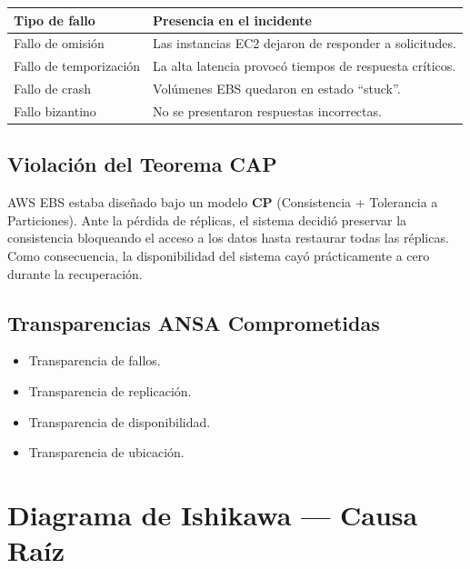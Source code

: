 \documentclass[10pt, a4paper]{article}
\begin{document}
\begin{center}
\small
\begin{tabular}{p{3cm} p{9cm}}
\toprule
\textbf{Tipo de fallo} & \textbf{Presencia en el incidente} \\
\midrule
Fallo de omisión & Las instancias EC2 dejaron de responder a solicitudes. \\
Fallo de temporización & La alta latencia provocó tiempos de respuesta críticos. \\
Fallo de crash & Volúmenes EBS quedaron en estado ``stuck''. \\
Fallo bizantino & No se presentaron respuestas incorrectas. \\
\bottomrule
\end{tabular}
\end{center}

\subsection{Violación del Teorema CAP}

AWS EBS estaba diseñado bajo un modelo \textbf{CP} (Consistencia + Tolerancia a Particiones). Ante la pérdida de réplicas, el sistema decidió preservar la consistencia bloqueando el acceso a los datos hasta restaurar todas las réplicas. Como consecuencia, la disponibilidad del sistema cayó prácticamente a cero durante la recuperación.

\subsection{Transparencias ANSA Comprometidas}

\begin{itemize}[noitemsep]
    \item Transparencia de fallos.
    \item Transparencia de replicación.
    \item Transparencia de disponibilidad.
    \item Transparencia de ubicación.
\end{itemize}

\section{Diagrama de Ishikawa --- Causa Raíz}
\end{document}
